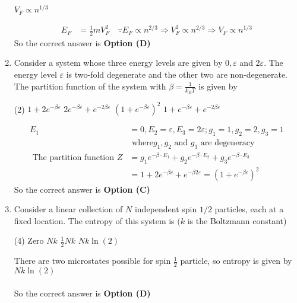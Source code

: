 \begin{enumerate}
\begin{tasks}
\task[\textbf{D.}] $V_{F} \propto n^{1 / 3}$
\end{tasks}
\begin{answer}
\begin{align*}
E_{F}&=\frac{1}{2} m V_{F}^{2} \quad \because E_{F} \propto n^{2 / 3} \Rightarrow V_{F}^{2} \propto n^{2 / 3} \Rightarrow V_{F} \propto n^{1 / 3}
\end{align*}
So the correct answer is \textbf{Option (D)}
\end{answer}
	\item Consider a system whose three energy levels are given by $0, \varepsilon$ and $2 \varepsilon$. The energy level $\varepsilon$ is two-fold degenerate and the other two are non-degenerate. The partition function of the system with $\beta=\frac{1}{k_{B} T}$ is given by
\begin{tasks}(2)
\task[\textbf{A.}] $1+2 e^{-\beta \varepsilon}$
\task[\textbf{B.}] $2 e^{-\beta \varepsilon}+e^{-2 \beta \varepsilon}$
\task[\textbf{C.}] $\left(1+e^{-\beta \varepsilon}\right)^{2}$
\task[\textbf{D.}] $1+e^{-\beta \varepsilon}+e^{-2 \beta \varepsilon}$
\end{tasks}
\begin{answer}
\begin{align*}
E_{1}&=0, E_{2}=\varepsilon, E_{3}=2 \varepsilon ; g_{1}=1, g_{2}=2, g_{3}=1\\&\text{ where} g_{1}, g_{2}\text{ and }g_{3}\text{ are degeneracy}\\
\text{	The partition function }Z&=g_{1} e^{-\beta \cdot E_{1}}+g_{2} e^{-\beta \cdot E_{2}}+g_{3} e^{-\beta \cdot E_{3}}\\&=1+2 e^{-\beta c}+e^{-\beta 2 \varepsilon}=\left(1+e^{-\beta \epsilon}\right)^{2}
\end{align*}
So the correct answer is \textbf{Option (C)}
\end{answer}
	\item Consider a linear collection of $N$ independent spin $1 / 2$ particles, each at a fixed location. The entropy of this system is $(k$ is the Boltzmann constant)
\begin{tasks}(4)
\task[\textbf{A.}] Zero
\task[\textbf{B.}]  $N k$
\task[\textbf{C.}]  $\frac{1}{2} N k$
\task[\textbf{D.}] $N k \ln (2)$
\end{tasks}
\begin{answer}
There are two microstates possible for spin $\frac{1}{2}$ particle, so entropy is given by $N k \ln (2)$\\\\
So the correct answer is \textbf{Option (D)}

\end{answer}
\end{enumerate}

